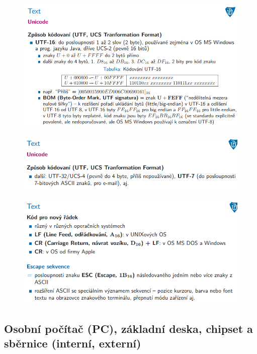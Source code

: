 \documentclass[10pt,a4paper]{article}
\begin{document}
\begin{figure} [h]
	\includegraphics[scale=0.65]{img/prvni_odstavec/otazka3/text9.png}	
\end{figure}

\begin{figure} [h]
	\includegraphics[scale=0.65]{img/prvni_odstavec/otazka3/text10.png}	
\end{figure}

\begin{figure} [h]
	\includegraphics[scale=0.65]{img/prvni_odstavec/otazka3/text11.png}	
\end{figure}



\clearpage
\subsection{Osobní počítač (PC), základní deska, chipset a sběrnice (interní, externí)}
\end{document}
